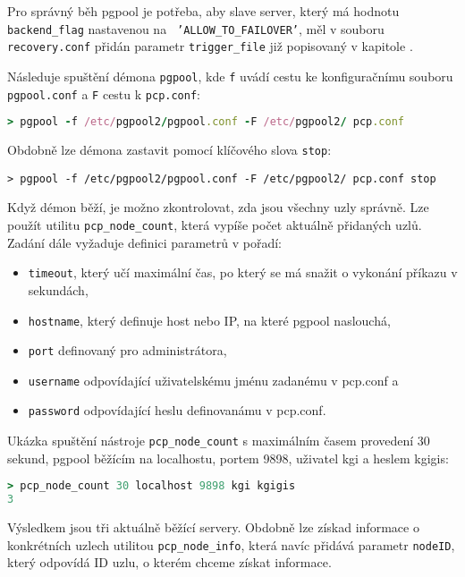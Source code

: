 Pro správný běh pgpool je potřeba, aby slave server, který má hodnotu \texttt{backend\_flag} nastavenou na \texttt{ 'ALLOW\_TO\_FAILOVER'}, měl v souboru \texttt{recovery.conf} přidán parametr \texttt{trigger\_file} již popisovaný v kapitole .

Následuje spuštění démona \texttt{pgpool}, kde \texttt{f} uvádí cestu ke konfiguračnímu souboru \texttt{pgpool.conf} a \texttt{F} cestu k \texttt{pcp.conf}:
\begin{lstlisting}[language=ruby,keywords={stop,pgpool}]
> pgpool -f /etc/pgpool2/pgpool.conf -F /etc/pgpool2/ pcp.conf
\end{lstlisting}

Obdobně lze démona zastavit pomocí klíčového slova \texttt{stop}:
\begin{lstlisting}[keywords={stop,pgpool}]
> pgpool -f /etc/pgpool2/pgpool.conf -F /etc/pgpool2/ pcp.conf stop
\end{lstlisting}

Když démon běží, je možno zkontrolovat, zda jsou všechny uzly správně. Lze použít utilitu \texttt{pcp\_node\_count}, která vypíše počet aktuálně přidaných uzlů. Zadání dále vyžaduje definici parametrů v pořadí:
 \begin{itemize}
\item \texttt{timeout}, který učí maximální čas, po který se má snažit o vykonání příkazu v sekundách,
\item \texttt{hostname}, který definuje host nebo  IP, na které pgpool naslouchá,
\item \texttt{port} definovaný pro administrátora,
\item \texttt{username} odpovídající uživatelskému jménu zadanému v pcp.conf a 
\item \texttt{password} odpovídající heslu definovanámu v pcp.conf.
\end{itemize}

Ukázka spuštění nástroje \texttt{pcp\_node\_count} s maximálním časem provedení 30 sekund, pgpool běžícím na localhostu, portem 9898, uživatel kgi a heslem kgigis:
\begin{lstlisting}[language=ruby,morekeywords={pcp_node_count}] 
> pcp_node_count 30 localhost 9898 kgi kgigis
3
\end{lstlisting}

Výsledkem jsou tři aktuálně běžící servery. Obdobně lze získad informace o konkrétních uzlech utilitou \texttt{pcp\_node\_info}, která navíc přidává parametr \texttt{nodeID}, který odpovídá ID uzlu, o kterém chceme získat informace.

